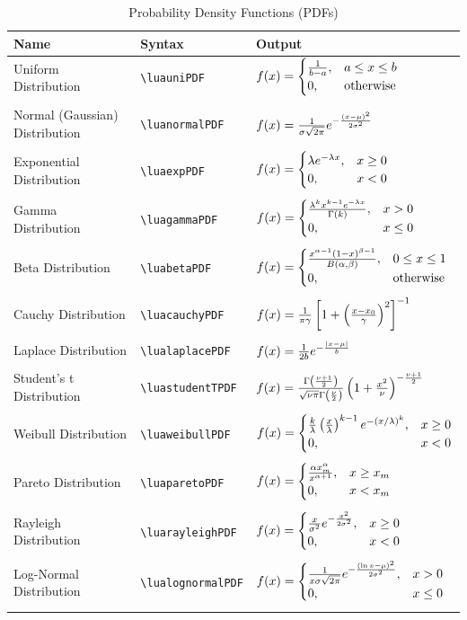 \begin{table}[ht]
	\centering
	\renewcommand{\arraystretch}{1.5}
	\small %
	\begin{tabularx}{\textwidth}{lXl}
		\toprule
		\textbf{Name} & \textbf{Syntax} & \textbf{Output} \\
		\midrule
		Uniform Distribution & \verb|\luauniPDF| & $\luauniPDF$ \\\\
		Normal (Gaussian) Distribution & \verb|\luanormalPDF| & $\luanormalPDF$ \\\\
		Exponential Distribution & \verb|\luaexpPDF| & $\luaexpPDF$ \\\\
		Gamma Distribution & \verb|\luagammaPDF| & $\luagammaPDF$ \\\\
		Beta Distribution & \verb|\luabetaPDF| & $\luabetaPDF$ \\\\
		Cauchy Distribution & \verb|\luacauchyPDF| & $\luacauchyPDF$ \\\\
		Laplace Distribution & \verb|\lualaplacePDF| & $\lualaplacePDF$ \\\\
		Student's t Distribution & \verb|\luastudentTPDF| & $\luastudentTPDF$ \\\\
		Weibull Distribution & \verb|\luaweibullPDF| & $\luaweibullPDF$ \\\\
		Pareto Distribution & \verb|\luaparetoPDF| & $\luaparetoPDF$ \\\\
		Rayleigh Distribution & \verb|\luarayleighPDF| & $\luarayleighPDF$ \\\\
		Log-Normal Distribution & \verb|\lualognormalPDF| & $\lualognormalPDF$ \\\\
		\bottomrule
	\end{tabularx}
	\caption{Probability Density Functions (PDFs)}
\end{table}
\newpage

